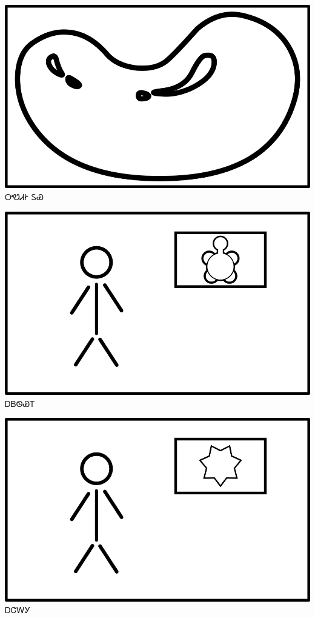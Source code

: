 \documentclass[avery5371]{flashcards}%
\begin{document}
    \begin{flashcard}{
        \includegraphics[width=0.95\columnwidth,height=.51\columnwidth,keepaspectratio]{../artwork/objects-neutral/tuya}
    }
        \Huge ᎤᏬᏗᎨ ᏚᏯ
    \end{flashcard}


    \begin{flashcard}{
        \includegraphics[width=0.95\columnwidth,height=.51\columnwidth,keepaspectratio]{../artwork/flags/adaksi-flag}
    }
        \Huge ᎠᏴᏫᏯᎢ
    \end{flashcard}

    \begin{flashcard}{
        \includegraphics[width=0.95\columnwidth,height=.51\columnwidth,keepaspectratio]{../artwork/flags/ajalagi-flag}
    }
        \Huge ᎠᏣᎳᎩ
    \end{flashcard}
\end{document}
